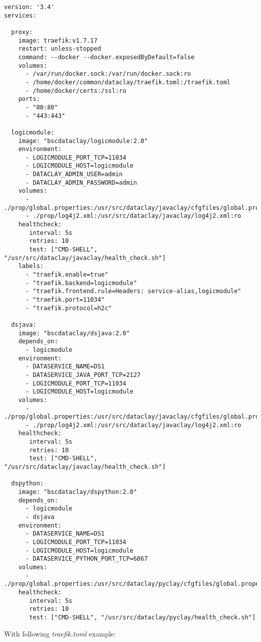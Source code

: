\begin{tBox}
 \begin{lstlisting}[language=docker-compose-2, frame=none]
version: '3.4'
services:

  proxy:
    image: traefik:v1.7.17
    restart: unless-stopped
    command: --docker --docker.exposedByDefault=false
    volumes:
      - /var/run/docker.sock:/var/run/docker.sock:ro
      - /home/docker/common/dataclay/traefik.toml:/traefik.toml
      - /home/docker/certs:/ssl:ro
    ports:
      - "80:80"
      - "443:443"
      
  logicmodule:
    image: "bscdataclay/logicmodule:2.0"
    environment:
      - LOGICMODULE_PORT_TCP=11034
      - LOGICMODULE_HOST=logicmodule
      - DATACLAY_ADMIN_USER=admin
      - DATACLAY_ADMIN_PASSWORD=admin
    volumes:
      - ./prop/global.properties:/usr/src/dataclay/javaclay/cfgfiles/global.properties:ro
      - ./prop/log4j2.xml:/usr/src/dataclay/javaclay/log4j2.xml:ro
    healthcheck:
       interval: 5s
       retries: 10
       test: ["CMD-SHELL", "/usr/src/dataclay/javaclay/health_check.sh"]
    labels:
      - "traefik.enable=true"
      - "traefik.backend=logicmodule"
      - "traefik.frontend.rule=Headers: service-alias,logicmodule"
      - "traefik.port=11034"
      - "traefik.protocol=h2c"
          
  dsjava:
    image: "bscdataclay/dsjava:2.0"
    depends_on:
      - logicmodule
    environment:
      - DATASERVICE_NAME=DS1
      - DATASERVICE_JAVA_PORT_TCP=2127
      - LOGICMODULE_PORT_TCP=11034
      - LOGICMODULE_HOST=logicmodule
    volumes:
      - ./prop/global.properties:/usr/src/dataclay/javaclay/cfgfiles/global.properties:ro
      - ./prop/log4j2.xml:/usr/src/dataclay/javaclay/log4j2.xml:ro
    healthcheck:
       interval: 5s
       retries: 10
       test: ["CMD-SHELL", "/usr/src/dataclay/javaclay/health_check.sh"]
       
  dspython:
    image: "bscdataclay/dspython:2.0"
    depends_on:
      - logicmodule
      - dsjava
    environment:
      - DATASERVICE_NAME=DS1
      - LOGICMODULE_PORT_TCP=11034
      - LOGICMODULE_HOST=logicmodule
      - DATASERVICE_PYTHON_PORT_TCP=6867
    volumes:
      - ./prop/global.properties:/usr/src/dataclay/pyclay/cfgfiles/global.properties:ro
    healthcheck:
       interval: 5s
       retries: 10
       test: ["CMD-SHELL", "/usr/src/dataclay/pyclay/health_check.sh"]
 \end{lstlisting}
\end{tBox}

With following \textit{traefik.toml} example:


